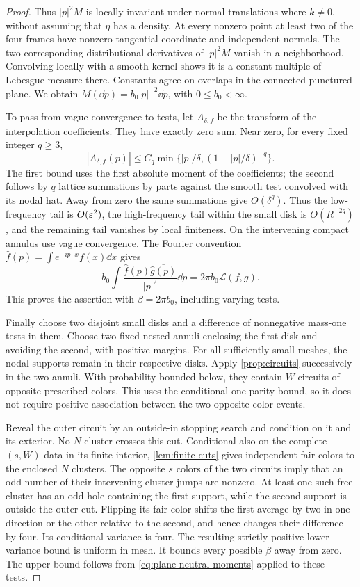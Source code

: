 \begin{proof}
Thus $|p|^2M$ is locally invariant under normal translations where
$k\ne0$, without assuming that $\eta$ has a density.
At every nonzero point at least two of the four frames have nonzero
tangential coordinate and independent normals. The two corresponding
distributional derivatives of $|p|^2M$ vanish in a neighborhood. Convolving
locally with a smooth kernel shows it is a constant multiple of Lebesgue
measure there. Constants agree on overlaps in the connected punctured plane.
We obtain $M(\dd p)=b_0|p|^{-2}\dd p$, with $0\le b_0<\infty$.

To pass from vague convergence to tests, let $A_{\delta,f}$ be the transform
of the interpolation coefficients. They have exactly zero sum. Near zero,
for every fixed integer $q\ge3$,
\[
 |A_{\delta,f}(p)|\le C_q
 \min\{|p|/\delta,(1+|p|/\delta)^{-q}\}.
\]
The first bound uses the first absolute moment of the coefficients; the
second follows by $q$ lattice summations by parts against the smooth test
convolved with its nodal hat. Away from zero the same summations give
$O(\delta^q)$. Thus the low-frequency tail is $O(\varepsilon^2)$, the high-frequency
tail within the small disk is $O(R^{-2q})$, and the remaining tail vanishes
by local finiteness. On the intervening compact annulus use vague convergence.
The Fourier convention $\widehat f(p)=\int e^{-ip\cdot x}f(x)\dd x$ gives
\[
 b_0\int\frac{\widehat f(p)\overline{\widehat g(p)}}{|p|^2}\dd p
   =2\pi b_0\mathcal L(f,g).
\]
This proves the assertion with $\beta=2\pi b_0$, including varying tests.

Finally choose two disjoint small disks and a difference of nonnegative
mass-one tests in them. Choose two fixed nested annuli enclosing the first
disk and avoiding the second, with positive margins. For all sufficiently
small meshes, the nodal supports remain in their respective disks.
Apply \cref{prop:circuits} successively in the two annuli. With probability
bounded below, they contain $W$ circuits of opposite prescribed colors.
This uses the conditional one-parity bound, so it does not require positive
association between the two opposite-color events.

Reveal the outer circuit by an outside-in stopping search and condition on
it and its exterior. No $N$ cluster crosses this cut. Conditional also on
the complete $(s,W)$ data in its finite interior, \cref{lem:finite-cuts}
gives independent fair colors to the enclosed $N$ clusters. The opposite
$s$ colors of the two circuits imply that an odd number of their intervening
cluster jumps are nonzero. At least one such free cluster has an odd hole
containing the first support, while the second support is outside the
outer cut. Flipping its fair color shifts the first average by two in one
direction or the other relative to the second, and hence changes their
difference by four. Its conditional variance is four.
The resulting strictly positive lower variance bound is uniform in mesh.
It bounds every possible $\beta$ away from zero. The upper bound follows
from \cref{eq:plane-neutral-moments} applied to these tests.
\end{proof}

